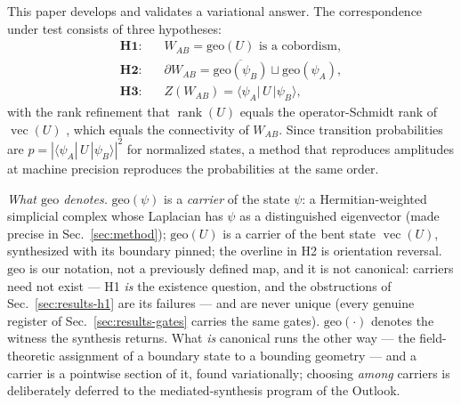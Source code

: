 \documentclass[a4paper,twocolumn,11pt,unpublished]{quantumarticle}
\theoremstyle{plain}
\theoremstyle{remark}
\newcommand{\geo}{\mathrm{geo}}
\newcommand{\vecop}{\operatorname{vec}}
\newcommand{\rk}{\operatorname{rank}}
\newcommand{\amp}[3]{\langle#1|\,#2\,|#3\rangle}
\begin{document}
This paper develops and validates a variational answer. The correspondence
under test consists of three hypotheses:
\begin{align}
  \textbf{H1:}\quad & W_{AB}=\geo(U) \text{ is a cobordism},\\
  \textbf{H2:}\quad & \partial W_{AB}
      = \overline{\geo(\psi_B)}\sqcup\geo(\psi_A),\\
  \textbf{H3:}\quad & Z(W_{AB})=\amp{\psi_A}{U}{\psi_B},
  \label{eq:h3}
\end{align}
with the rank refinement that $\rk(U)$ equals the operator-Schmidt rank
of $\vecop(U)$ \cite{Nielsen2003DynamicsResource}, which equals the
connectivity of $W_{AB}$. Since transition probabilities are
$p=|\amp{\psi_A}{U}{\psi_B}|^2$ for normalized states, a method that
reproduces amplitudes at machine precision reproduces the probabilities at
the same order.

\emph{What $\geo$ denotes.} $\geo(\psi)$ is a \emph{carrier} of the state
$\psi$: a Hermitian-weighted simplicial complex whose Laplacian has
$\psi$ as a distinguished eigenvector (made precise in
Sec.~\ref{sec:method}); $\geo(U)$ is a carrier of the bent state
$\vecop(U)$, synthesized with its boundary pinned; the overline in H2 is
orientation reversal. $\geo$ is our notation, not a previously defined
map, and it is not canonical: carriers need not exist --- H1 \emph{is}
the existence question, and the obstructions of
Sec.~\ref{sec:results-h1} are its failures --- and are never unique
(every genuine register of Sec.~\ref{sec:results-gates} carries the same
gates). $\geo(\cdot)$ denotes the witness the synthesis returns. What
\emph{is} canonical runs the other way --- the field-theoretic
assignment of a boundary state to a bounding geometry
\cite{Atiyah1988TQFT,HartleHawking1983WaveFunction,Oeckl2003GeneralBoundary}
--- and a carrier is a pointwise section of it, found variationally;
choosing \emph{among} carriers is deliberately deferred to the
mediated-synthesis program of the Outlook.
\end{document}
